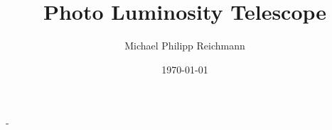 \documentclass[british,11pt,a4paper]{memoir}
\title{Photo Luminosity Telescope}
\author{Michael Philipp Reichmann}
\date{\today}
\begin{document}
\frontmatter
\begin{titlingpage}
  \calccentering{\unitlength}
  \begin{adjustwidth*}{\unitlength-24pt}{-\unitlength-24pt}
    \maketitle
  \end{adjustwidth*}
\end{titlingpage}

\cleartorecto
\tableofcontents
\mainmatter

\appendix

\backmatter



\end{document}
